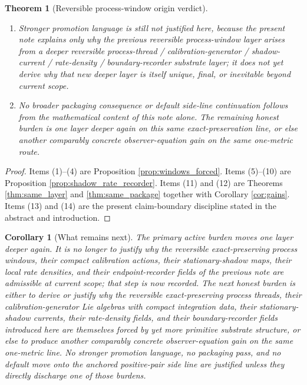 \documentclass[11pt]{article}
\newtheorem{corollary}{Corollary}
\newtheorem{theorem}{Theorem}
\begin{document}
\begin{theorem}[Reversible process-window origin verdict]
\begin{enumerate}
    \item Stronger promotion language is still not justified here, because the present note explains only why the previous reversible process-window layer arises from a deeper reversible process-thread / calibration-generator / shadow-current / rate-density / boundary-recorder substrate layer; it does not yet derive why that new deeper layer is itself unique, final, or inevitable beyond current scope.
    \item No broader packaging consequence or default side-line continuation follows from the mathematical content of this note alone. The remaining honest burden is one layer deeper again on this same exact-preservation line, or else another comparably concrete observer-equation gain on the same one-metric route.
\end{enumerate}
\end{theorem}

\begin{proof}
Items (1)--(4) are Proposition \ref{prop:windows_forced}. Items (5)--(10) are Proposition \ref{prop:shadow_rate_recorder}. Items (11) and (12) are Theorems \ref{thm:same_layer} and \ref{thm:same_package} together with Corollary \ref{cor:gains}. Items (13) and (14) are the present claim-boundary discipline stated in the abstract and introduction.
\end{proof}

\begin{corollary}[What remains next]
\label{cor:what_next}
The primary active burden moves one layer deeper again. It is no longer to justify why the reversible exact-preserving process windows, their compact calibration actions, their stationary-shadow maps, their local rate densities, and their endpoint-recorder fields of the previous note are admissible at current scope; that step is now recorded. The next honest burden is either to derive or justify why the reversible exact-preserving process threads, their calibration-generator Lie algebras with compact integration data, their stationary-shadow currents, their rate-density fields, and their boundary-recorder fields introduced here are themselves forced by yet more primitive substrate structure, or else to produce another comparably concrete observer-equation gain on the same one-metric line. No stronger promotion language, no packaging pass, and no default move onto the anchored positive-pair side line are justified unless they directly discharge one of those burdens.
\end{corollary}
\end{document}
